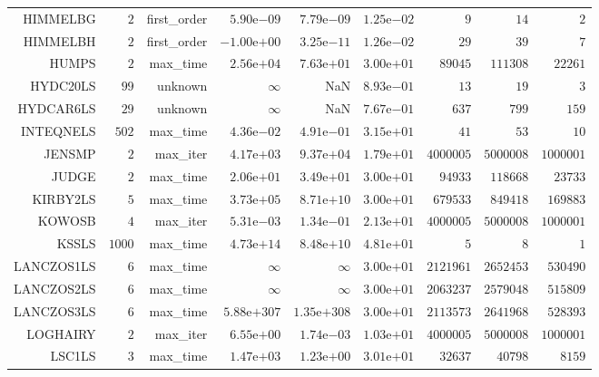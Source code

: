 \begin{longtable}{rrrrrrrrr}
HIMMELBG & \(     2\) & first\_order & \( 5.90\)e\(-09\) & \( 7.79\)e\(-09\) & \( 1.25\)e\(-02\) & \(     9\) & \(    14\) & \(     2\) \\
HIMMELBH & \(     2\) & first\_order & \(-1.00\)e\(+00\) & \( 3.25\)e\(-11\) & \( 1.26\)e\(-02\) & \(    29\) & \(    39\) & \(     7\) \\
HUMPS & \(     2\) & max\_time & \( 2.56\)e\(+04\) & \( 7.63\)e\(+01\) & \( 3.00\)e\(+01\) & \( 89045\) & \(111308\) & \( 22261\) \\
HYDC20LS & \(    99\) & unknown & \(\infty\) &       NaN & \( 8.93\)e\(-01\) & \(    13\) & \(    19\) & \(     3\) \\
HYDCAR6LS & \(    29\) & unknown & \(\infty\) &       NaN & \( 7.67\)e\(-01\) & \(   637\) & \(   799\) & \(   159\) \\
INTEQNELS & \(   502\) & max\_time & \( 4.36\)e\(-02\) & \( 4.91\)e\(-01\) & \( 3.15\)e\(+01\) & \(    41\) & \(    53\) & \(    10\) \\
JENSMP & \(     2\) & max\_iter & \( 4.17\)e\(+03\) & \( 9.37\)e\(+04\) & \( 1.79\)e\(+01\) & \(4000005\) & \(5000008\) & \(1000001\) \\
JUDGE & \(     2\) & max\_time & \( 2.06\)e\(+01\) & \( 3.49\)e\(+01\) & \( 3.00\)e\(+01\) & \( 94933\) & \(118668\) & \( 23733\) \\
KIRBY2LS & \(     5\) & max\_time & \( 3.73\)e\(+05\) & \( 8.71\)e\(+10\) & \( 3.00\)e\(+01\) & \(679533\) & \(849418\) & \(169883\) \\
KOWOSB & \(     4\) & max\_iter & \( 5.31\)e\(-03\) & \( 1.34\)e\(-01\) & \( 2.13\)e\(+01\) & \(4000005\) & \(5000008\) & \(1000001\) \\
KSSLS & \(  1000\) & max\_time & \( 4.73\)e\(+14\) & \( 8.48\)e\(+10\) & \( 4.81\)e\(+01\) & \(     5\) & \(     8\) & \(     1\) \\
LANCZOS1LS & \(     6\) & max\_time & \(\infty\) & \(\infty\) & \( 3.00\)e\(+01\) & \(2121961\) & \(2652453\) & \(530490\) \\
LANCZOS2LS & \(     6\) & max\_time & \(\infty\) & \(\infty\) & \( 3.00\)e\(+01\) & \(2063237\) & \(2579048\) & \(515809\) \\
LANCZOS3LS & \(     6\) & max\_time & \(5.88\)e\(+307\) & \(1.35\)e\(+308\) & \( 3.00\)e\(+01\) & \(2113573\) & \(2641968\) & \(528393\) \\
LOGHAIRY & \(     2\) & max\_iter & \( 6.55\)e\(+00\) & \( 1.74\)e\(-03\) & \( 1.03\)e\(+01\) & \(4000005\) & \(5000008\) & \(1000001\) \\
LSC1LS & \(     3\) & max\_time & \( 1.47\)e\(+03\) & \( 1.23\)e\(+00\) & \( 3.01\)e\(+01\) & \( 32637\) & \( 40798\) & \(  8159\) \\

\end{longtable}
